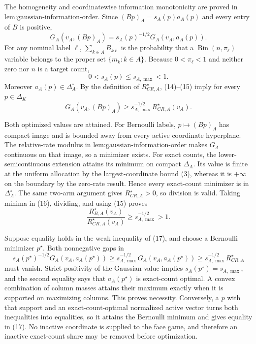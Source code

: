 The homogeneity and coordinatewise information monotonicity are proved in \(\text{lem:gaussian-information-order}\).  Since \((Bp)_A=s_A(p)a_A(p)\) and every entry of \(B\) is positive,
\[
G_A(v_A,(Bp)_A)=s_A(p)^{-1/2}G_A(v_A,a_A(p)). \tag{14}
\]
For any nominal label \(\ell\), \(\sum_{k\in A}B_{k\ell}\) is the probability that a \(\operatorname{Bin}(n,\pi_\ell)\) variable belongs to the proper set \(\{m_k:k\in A\}\).  Because \(0<\pi_\ell<1\) and neither zero nor \(n\) is a target count,
\[
0<s_A(p)\leq s_{A,\max}<1. \tag{15}
\]
Moreover \(a_A(p)\in\Delta_A^\circ\).  By the definition of \(R_{CR,A}^\star\), (14)--(15) imply for every \(p\in\Delta_K\)
\[
G_A(v_A,(Bp)_A)
\geq s_{A,\max}^{-1/2}R_{CR,A}^\star(v_A). \tag{16}
\]

Both optimized values are attained.  For Bernoulli labels, \(p\mapsto(Bp)_A\) has compact image and is bounded away from every active coordinate hyperplane.  The relative-rate modulus in \(\text{lem:gaussian-information-order}\) makes \(G_A\) continuous on that image, so a minimizer exists.  For exact counts, the lower-semicontinuous extension attains its minimum on compact \(\Delta_A\).  Its value is finite at the uniform allocation by the largest-coordinate bound (3), whereas it is \(+\infty\) on the boundary by the zero-rate result.  Hence every exact-count minimizer is in \(\Delta_A^\circ\).  The same two-arm argument gives \(R_{CR,A}^\star>0\), so division is valid.  Taking minima in (16), dividing, and using (15) proves
\[
\frac{R_{B,A}^\star(v_A)}{R_{CR,A}^\star(v_A)}
\geq s_{A,\max}^{-1/2}>1. \tag{17}
\]

Suppose equality holds in the weak inequality of (17), and choose a Bernoulli minimizer \(p^\star\).  Both nonnegative gaps in
\[
s_A(p^\star)^{-1/2}G_A(v_A,a_A(p^\star))
\geq s_{A,\max}^{-1/2}G_A(v_A,a_A(p^\star))
\geq s_{A,\max}^{-1/2}R_{CR,A}^\star
\]
must vanish.  Strict positivity of the Gaussian value implies \(s_A(p^\star)=s_{A,\max}\), and the second equality says that \(a_A(p^\star)\) is exact-count optimal.  A convex combination of column masses attains their maximum exactly when it is supported on maximizing columns.  This proves necessity.  Conversely, a \(p\) with that support and an exact-count-optimal normalized active vector turns both inequalities into equalities, so it attains the Bernoulli minimum and gives equality in (17).  No inactive coordinate is supplied to the face game, and therefore an inactive exact-count share may be removed before optimization.